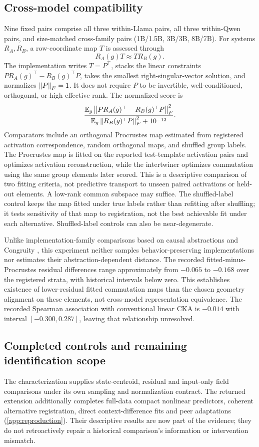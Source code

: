 \FloatBarrier
\subsection{Cross-model compatibility}
Nine fixed pairs comprise all three within-Llama pairs, all three within-Qwen pairs, and size-matched cross-family pairs (1B/1.5B, 3B/3B, 8B/7B). For systems $R_A,R_B$, a row-coordinate map $T$ is assessed through
\[
 R_A(g)T\approx TR_B(g).
\]
The implementation writes $T=P^\top$, stacks the linear constraints $PR_A(g)^\top-R_B(g)^\top P$, takes the smallest right-singular-vector solution, and normalizes $\left\lVert P\right\rVert_F=1$. It does not require $P$ to be invertible, well-conditioned, orthogonal, or high effective rank. The normalized score is
\[
 \frac{\mathbb{E}_g\left\lVert PR_A(g)^\top-R_B(g)^\top P\right\rVert_F^2}
 {\mathbb{E}_g\left\lVert R_B(g)^\top P\right\rVert_F^2+10^{-12}}.
\]
Comparators include an orthogonal Procrustes map estimated from registered activation correspondence, random orthogonal maps, and shuffled group labels. The Procrustes map is fitted on the reported test-template activation pairs and optimizes activation reconstruction, while the intertwiner optimizes commutation using the same group elements later scored. This is a descriptive comparison of two fitting criteria, not predictive transport to unseen paired activations or held-out elements. A low-rank common subspace may suffice. The shuffled-label control keeps the map fitted under true labels rather than refitting after shuffling; it tests sensitivity of that map to registration, not the best achievable fit under each alternative. Shuffled-label controls can also be near-degenerate.

Unlike implementation-family comparisons based on causal abstractions and Congruity \citep{sun2026tracking}, this experiment neither samples behavior-preserving implementations nor estimates their abstraction-dependent distance. The recorded fitted-minus-Procrustes residual differences range approximately from $-0.065$ to $-0.168$ over the registered strata, with historical intervals below zero. This establishes existence of lower-residual fitted commutation maps than the chosen geometry alignment on these elements, not cross-model representation equivalence. The recorded Spearman association with conventional linear CKA is $-0.014$ with interval $[-0.300,0.287]$, leaving that relationship unresolved.

\subsection{Completed controls and remaining identification scope}
The characterization supplies state-centroid, residual and input-only field comparisons under its own sampling and normalization contract. The returned extension additionally completes full-data compact nonlinear predictors, coherent alternative registration, direct context-difference fits and peer adaptations (\cref{app:reproduction}). Their descriptive results are now part of the evidence; they do not retroactively repair a historical comparison's information or intervention mismatch.

